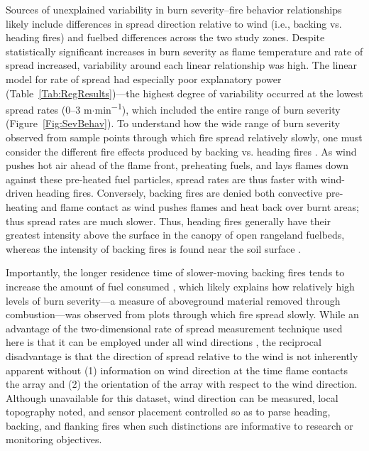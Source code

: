 \documentclass[fire,article,accept,oneauthor,pdftex]{Definitions/mdpi}
\begin{document}
Sources of unexplained variability in burn severity--fire behavior relationships likely include differences in spread direction relative to wind ({i.e.}, backing vs. heading fires) and fuelbed differences across the two study zones.
Despite statistically significant increases in burn severity as flame temperature and rate of spread increased, variability around each linear relationship was high. 
The linear model for rate of spread had especially poor explanatory power (Table~\ref{Tab:RegResults})---the highest degree of variability occurred at the lowest spread rates (0--3 m$\cdot$min\textsuperscript{$-$1}), which included the entire range of burn severity (Figure~\ref{Fig:SevBehav}). 
To understand how the wide range of burn severity observed from sample points through which fire spread relatively slowly, one must consider the different fire effects produced by backing vs. heading fires \cite{rothermel1980}. 
As wind pushes hot air ahead of the flame front, preheating fuels, and lays flames down against these pre-heated fuel particles, spread rates are thus faster with wind-driven heading fires. 
Conversely, backing fires are denied both convective pre-heating and flame contact as wind pushes flames and heat back over burnt areas; thus spread rates are much slower. 
Thus, heading fires generally have their greatest intensity above the surface in the canopy of open rangeland fuelbeds, whereas the intensity of backing fires is found near the soil surface \cite{trollope1978}.

Importantly, the longer residence time of slower-moving backing fires tends to increase the amount of fuel consumed \cite{trollope1984}, which likely explains how relatively high levels of burn severity---a measure of aboveground material removed through combustion---was observed from plots through which fire spread slowly. 
While an advantage of the two-dimensional rate of spread measurement technique used here is that it can be employed under all wind directions \cite{finney2021}, the reciprocal disadvantage is that the direction of spread relative to the wind is not inherently apparent without (1) information on wind direction at the time flame contacts the array and (2) the orientation of the array with respect to the wind direction. 
Although unavailable for this dataset, wind direction can be measured, local topography noted, and sensor placement controlled so as to parse heading, backing, and flanking fires when such distinctions are informative to research or monitoring objectives. 
\end{document}
